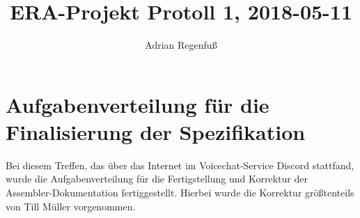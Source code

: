 \documentclass{article}
\title{ERA-Projekt Protoll 1, 2018-05-11}
\author{Adrian Regenfuß}
\begin{document}
\maketitle

\section{Aufgabenverteilung für die Finalisierung der Spezifikation}

Bei diesem Treffen, das über das Internet im Voicechat-Service Discord
stattfand, wurde die Aufgabenverteilung für die Fertigstellung und Korrektur
der Assembler-Dokumentation fertiggestellt. Hierbei wurde die Korrektur
größtenteils von Till Müller vorgenommen.
\end{document}
